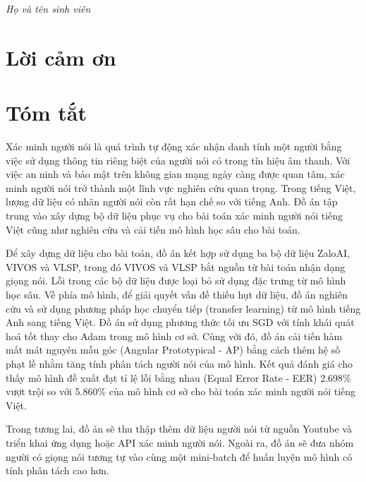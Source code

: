 \documentclass[a4paper, 13pt, oneside]{report}
\begin{document}
    \begin{flushright}
        \begin{minipage}{0.45\textwidth} 
            \begin{center}
                \textit{Họ và tên sinh viên}
            \end{center}
        \end{minipage}
    \end{flushright}
    
    
\newpage
\chapter*{\centering Lời cảm ơn}
\newpage

\chapter*{\centering Tóm tắt}
Xác minh người nói là quá trình tự động xác nhận danh tính một người bằng việc sử dụng thông tin riêng biệt của người nói có trong tín hiệu âm thanh. Với việc an ninh và bảo mật trên không gian mạng ngày càng được quan tâm, xác minh người nói trở thành một lĩnh vực nghiên cứu quan trọng. Trong tiếng Việt, lượng dữ liệu có nhãn người nói còn rất hạn chế so với tiếng Anh. Đồ án tập trung vào xây dựng bộ dữ liệu phục vụ cho bài toán xác minh người nói tiếng Việt cũng như nghiên cứu và cải tiến mô hình học sâu cho bài toán.

Để xây dựng dữ liệu cho bài toán, đồ án kết hợp sử dụng ba bộ dữ liệu ZaloAI, VIVOS và VLSP, trong đó VIVOS và VLSP bắt nguồn từ bài toán nhận dạng giọng nói. Lỗi trong các bộ dữ liệu được loại bỏ sử dụng đặc trưng từ mô hình học sâu. Về phía mô hình, để giải quyết vấn đề thiếu hụt dữ liệu, đồ án nghiên cứu và sử dụng phương pháp học chuyển tiếp (transfer learning) từ mô hình tiếng Anh sang tiếng Việt. Đồ án sử dụng phương thức tối ưu SGD với tính khái quát hoá tốt thay cho Adam trong mô hình cơ sở. Cùng với đó, đồ án cải tiến hàm mất mát nguyên mẫu góc (Angular Prototypical - AP)\cite{chung2020defence} bằng cách thêm hệ số phạt lề nhằm tăng tính phân tách người nói của mô hình. Kết quả đánh giá cho thấy mô hình đề xuất đạt tỉ lệ lỗi bằng nhau (Equal Error Rate - EER) 2.698\% vượt trội so với 5.860\% của mô hình cơ sở cho bài toán xác minh người nói tiếng Việt.

Trong tương lai, đồ án sẽ thu thập thêm dữ liệu người nói từ nguồn Youtube và triển khai ứng dụng hoặc API xác minh người nói. Ngoài ra, đồ án sẽ đưa nhóm người có giọng nói tương tự vào cùng một mini-batch để huấn luyện mô hình có tính phân tách cao hơn. 
\end{document}
